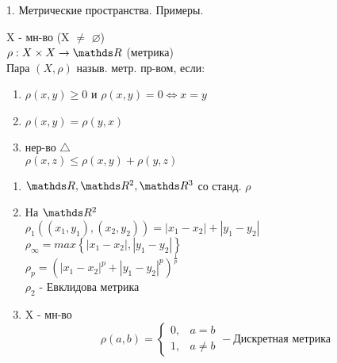 \documentclass[11pt, fleqn]{article}
\begin{document}
    \begin{question}{1. Метрические пространства. Примеры.}
        \begin{definition} 
            X - мн-во (X $\neq$ $\varnothing$) \\
            $\rho: X \times X \rightarrow \R$ (метрика)\\
            Пара $(X, \rho)$ назыв. метр. пр-вом, если:\\
            \begin{enumerate} 
                \item $\rho(x, y) \geq 0$ и $\rho(x, y) = 0 \Leftrightarrow x = y$ 
                \item $\rho(x, y) = \rho(y, x)$
                \item нер-во $\bigtriangleup$ \\ $\rho(x, z) \leq \rho(x, y) + \rho(y, z)$
            \end{enumerate}
        \end{definition}

        \begin{examples}
            \begin{enumerate}
                \item $\R, \R^2, \R^3$ со станд. $\rho$
                \item На $\R^2$\\
                      $\rho_1((x_1, y_1), (x_2, y_2)) = |x_1 - x_2| + |y_1 - y_2|$\\
                      $\rho_\infty = max\left\{|x_1 - x_2|, |y_1 - y_2|\right\}$\\
                      $\rho_p = (|x_1 - x_2|^p + |y_1 - y_2|^p)^{\frac{1}{p}}$\\
                      $\rho_2$ - Евклидова метрика
                \item X - мн-во\\
                    \[\rho(a, b) =  \begin{cases}
                            0, &a = b\\
                            1, &a \neq b
                                \end{cases}- \text{Дискретная метрика}\]
            \end{enumerate}
        \end{examples}

    \end{question}
    
\end{document}
